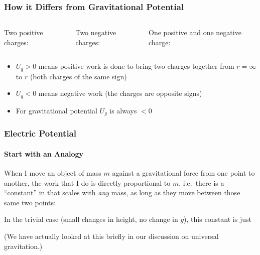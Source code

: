 \documentclass[12pt,aspectratio=169]{beamer}
\newcommand{\eq}[2]{\vspace{#1}{\Large\begin{displaymath}#2\end{displaymath}}}
\begin{document}
\begin{frame}
  \frametitle{How it Differs from Gravitational Potential}
  \begin{columns}
    \begin{center}
      Two positive charges:

      \eq{-.3in}{U_q>0}
    \end{center}
    
    \begin{center}
      Two negative charges:

      \eq{-.3in}{U_q>0}
    \end{center}
    
    \begin{center}
      One positive and one negative charge:

      \eq{-.5in}{U_q<0}
    \end{center}
  \end{columns}

  \vspace{.2in}
  \begin{itemize}
  \item $U_q>0$ means positive work is done to bring two charges together from
   $r=\infty$ to $r$ (both charges of the same sign)
  \item $U_q<0$ means negative work (the charges are opposite signs)
  \item For gravitational potential $U_g$ is always $<0$
  \end{itemize}
\end{frame}

\begin{frame}
  \frametitle{Electric Potential}
  \framesubtitle{Start with an Analogy}

  When I move an object of mass $m$ against a gravitational force from one
  point to another, the work that I do is directly proportional to $m$, i.e.\
  there is a ``constant'' in that scales with \emph{any} mass, as long as they
  move between those same two points:

  \eq{-.25in}{W=\Delta U_g=Km}

  \vspace{-.15in}In the trivial case (small changes in height, no change in
  $g$), this constant is just

  \eq{-.15in}{
    \frac{\Delta U_g}{m}=g\Delta h
  }

  \vspace{-.1in}(We have actually looked at this briefly in our discussion on
  universal gravitation.)
\end{frame}
\end{document}
